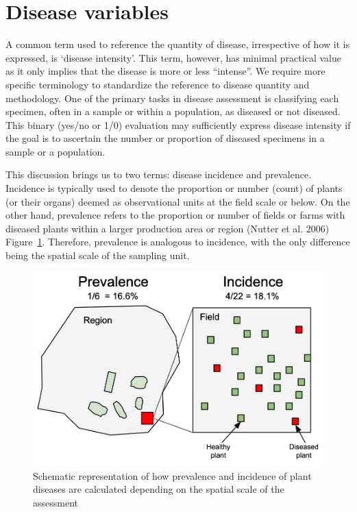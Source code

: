 \documentclass[
  letterpaper,
]{book}
\begin{document}
\hypertarget{disease-variables-1}{%
\section{Disease variables}\label{disease-variables-1}}

A common term used to reference the quantity of disease, irrespective of
how it is expressed, is `disease intensity'. This term, however, has
minimal practical value as it only implies that the disease is more or
less ``intense''. We require more specific terminology to standardize
the reference to disease quantity and methodology. One of the primary
tasks in disease assessment is classifying each specimen, often in a
sample or within a population, as diseased or not diseased. This binary
(yes/no or 1/0) evaluation may sufficiently express disease intensity if
the goal is to ascertain the number or proportion of diseased specimens
in a sample or a population.

This discussion brings us to two terms: disease incidence and
prevalence. Incidence is typically used to denote the proportion or
number (count) of plants (or their organs) deemed as observational units
at the field scale or below. On the other hand, prevalence refers to the
proportion or number of fields or farms with diseased plants within a
larger production area or region (Nutter et al. 2006)
Figure~\ref{fig-prevalence_incidence}. Therefore, prevalence is
analogous to incidence, with the only difference being the spatial scale
of the sampling unit.

\begin{figure}

{\centering \includegraphics[width=5in,height=\textheight]{imgs/prevalence_incidence.png}

}

\caption{\label{fig-prevalence_incidence}Schematic representation of how
prevalence and incidence of plant diseases are calculated depending on
the spatial scale of the assessment}

\end{figure}
\end{document}
